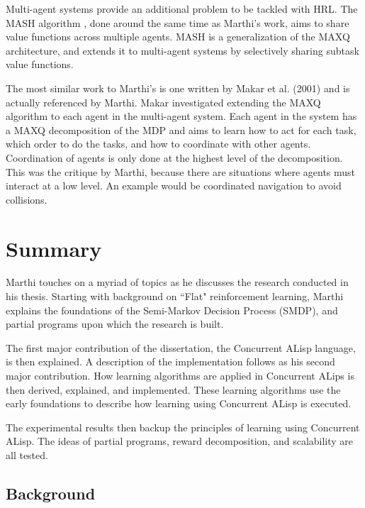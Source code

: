 \documentclass[jair,twoside,11pt,theapa]{article}
\begin{document}
Multi-agent systems provide an additional problem to be tackled with HRL. The MASH algorithm \cite{mehta:2005}, done around the same time as Marthi's work, aims to share value functions across multiple agents. MASH is a generalization of the MAXQ architecture, and extends it to multi-agent systems by selectively sharing subtask value functions.

The most similar work to Marthi's is one written by Makar et al. (2001) \cite{Makar:2001} and is actually referenced by Marthi. Makar investigated extending the MAXQ algorithm to each agent in the multi-agent system. Each agent in the system has a MAXQ decomposition of the MDP and aims to learn how to act for each task, which order to do the tasks, and how to coordinate with other agents. Coordination of agents is only done at the highest level of the decomposition. This was the critique by Marthi, because there are situations where agents must interact at a low level. An example would be coordinated navigation to avoid collisions. 


\section{Summary}
\label{Summary}
Marthi touches on a myriad of topics as he discusses the research conducted in his thesis. Starting with background on ``Flat" reinforcement learning, Marthi explains the foundations of the Semi-Markov Decision Process (SMDP), and partial programs upon which the research is built.

The first major contribution of the dissertation, the Concurrent ALisp language, is then explained. A description of the implementation follows as his second major contribution. How learning algorithms are applied in Concurrent ALips is then derived, explained, and implemented. These learning algorithms use the early foundations to describe how learning using Concurrent ALisp is executed.

The experimental results then backup the principles of learning using Concurrent ALisp. The ideas of partial programs, reward decomposition, and scalability are all tested.

\subsection{Background}
\label{Background}
\end{document}
